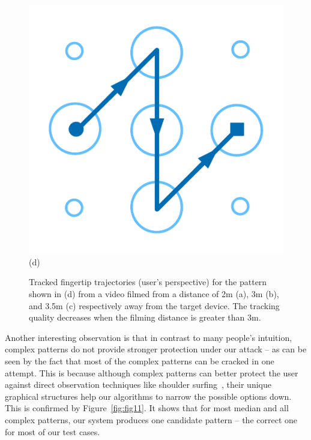 \begin{figure}[!ht]
{\begin{minipage}[b]{0.19\textwidth}
                \includegraphics[width=\textwidth]{fig/distance-pattern.pdf}\\
                \centering  (d)
                \end{minipage}
            }

            \caption{Tracked fingertip trajectories (user's perspective) for the pattern shown in (d) from a video filmed from a distance of 2m (a), 3m (b), and 3.5m (c) respectively away from the target device. The tracking quality decreases when the filming distance is greater than 3m. }
            \label{fig:distance-show}
        \end{figure}

         Another interesting observation is that in contrast to many people's
        intuition, complex patterns do not provide stronger protection under our attack -- as can be seen by the fact that
        most of the complex patterns can be cracked in one attempt.
        This is because although complex patterns can better protect the user against direct observation techniques like shoulder surfing~\cite{shoulder}, their unique graphical structures
        help our algorithms to narrow the possible options down. This is
        confirmed by Figure~\ref{fig:fig11}. It shows that for most median and all complex patterns, our system produces one candidate pattern --
        the correct one for most of our test cases.

